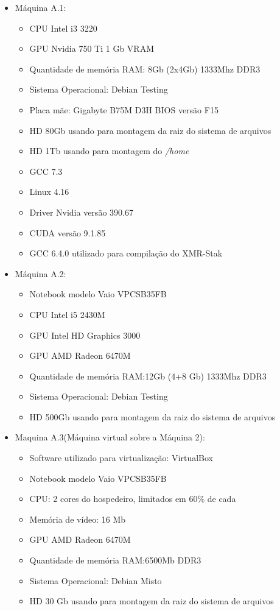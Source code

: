 \begin{itemize}

\item Máquina A.1:%
\begin{itemize}
	\item \acrshort{CPU} Intel i3 3220
	\item \acrshort{GPU} Nvidia 750 Ti 1 Gb VRAM
	\item Quantidade de memória \acrshort{RAM}: 8Gb (2x4Gb) 1333Mhz DDR3
	\item Sistema Operacional: Debian Testing
	\item Placa mãe: Gigabyte B75M D3H BIOS versão F15
	\item HD 80Gb usando para montagem da raiz do sistema de arquivos 
	\item HD 1Tb usando para montagem do \textit{/home}
	\item GCC 7.3
	\item Linux 4.16
	\item Driver Nvidia versão 390.67
	\item CUDA versão 9.1.85
	\item GCC 6.4.0 utilizado para compilação do XMR-Stak
\end{itemize}

\item Máquina A.2:%

\begin{itemize}
	\item Notebook modelo Vaio VPCSB35FB
	\item \acrshort{CPU} Intel i5 2430M
	\item \acrshort{GPU} Intel HD Graphics 3000
	\item \acrshort{GPU} AMD Radeon 6470M
	\item Quantidade de memória \acrshort{RAM}:12Gb (4+8 Gb) 1333Mhz DDR3
	\item Sistema Operacional: Debian Testing
	\item HD 500Gb usando para montagem da raiz do sistema de arquivos 
\end{itemize}

\item Maquina A.3(Máquina virtual sobre a Máquina 2):%

\begin{itemize}
	\item Software utilizado para virtualização: VirtualBox
	\item Notebook modelo Vaio VPCSB35FB
	\item \acrshort{CPU}: 2 cores do hospedeiro, limitados em 60\% de cada
	\item Memória de vídeo: 16 Mb
	\item \acrshort{GPU} AMD Radeon 6470M
	\item Quantidade de memória \acrshort{RAM}:6500Mb DDR3
	\item Sistema Operacional: Debian Misto
	\item HD 30 Gb usando para montagem da raiz do sistema de arquivos 
\end{itemize}

\end{itemize}
